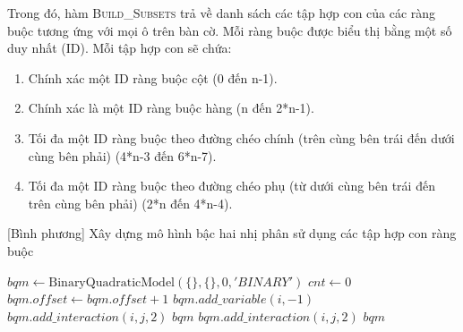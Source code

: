Trong đó, hàm \textsc{Build\_Subsets} trả về danh sách các tập hợp con của các ràng buộc tương ứng với mọi ô trên bàn cờ. Mỗi ràng buộc được biểu thị bằng một số duy nhất (ID). Mỗi tập hợp con sẽ chứa:
\begin{enumerate}
	

	\item Chính xác một ID ràng buộc cột (0 đến n-1).
	\item Chính xác là một ID ràng buộc hàng (n đến 2*n-1).
	\item Tối đa một ID ràng buộc theo đường chéo chính (trên cùng bên trái đến dưới cùng bên phải) (4*n-3
	đến 6*n-7).
	\item Tối đa một ID ràng buộc theo đường chéo phụ (từ dưới cùng bên trái đến trên cùng bên phải) (2*n đến
	4*n-4).
\end{enumerate}
\begin{algorithm}[H]
	\caption{[Bình phương] Xây dựng mô hình bậc hai nhị phân sử dụng các tập hợp con ràng buộc}
    \begin{algorithmic}[1]
            \State $bqm \gets \text{BinaryQuadraticModel}(\{\}, \{\}, 0, 'BINARY')$
            \State $cnt \gets 0$
                \State $bqm.offset \gets bqm.offset + 1$
                        \State $bqm.add\_variable(i, -1)$
                                \State $bqm.add\_interaction(i, j, 2)$
                            \EndIf
                        \EndFor
                    \EndIf
                \EndFor
            \EndFor
            \State \Return $bqm$
        \EndFunction
        \State
                                \State $bqm.add\_interaction(i, j, 2)$
                            \EndIf
                        \EndFor
                    \EndIf
                \EndFor
            \EndFor
            \State \Return $bqm$
        \EndFunction
            
    \end{algorithmic}
    
\end{algorithm}

